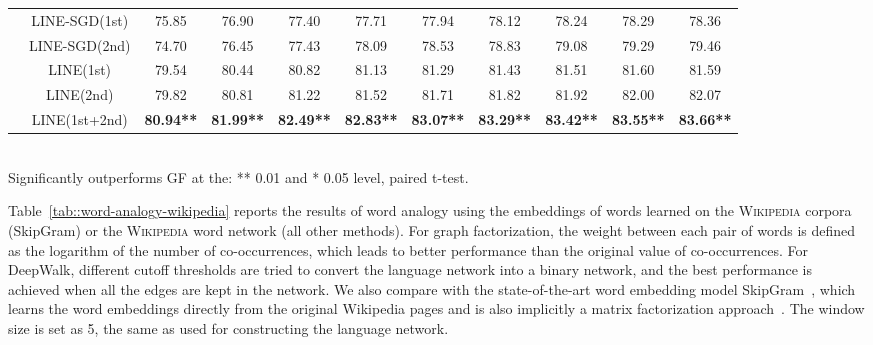 \documentclass{sig-alternate-2013}
\begin{document}
\begin{table*}[!htdb]
{\begin{tabular}{|c|c|c|c|c|c|c|c|c|c|c|}
			&LINE-SGD(1st)& 75.85&	76.90&	77.40&	77.71&	77.94&	78.12&	78.24&	78.29&	78.36 \\
			&LINE-SGD(2nd)& 74.70&	76.45&	77.43&	78.09&	78.53&	78.83&	79.08&	79.29&	79.46\\ 
			&LINE(1st)& 79.54&	80.44&	80.82&	81.13&	81.29&	81.43&	81.51&	81.60&	81.59  \\ 
			&LINE(2nd)& 79.82&	80.81&	81.22&	81.52&	81.71&	81.82&	81.92&	82.00&	82.07 \\ 		
			&LINE(1st+2nd)& \textbf{80.94**}&	\textbf{81.99**}&	\textbf{82.49**}&	\textbf{82.83**}&	\textbf{83.07**}&	\textbf{83.29**}&	\textbf{83.42**}&	\textbf{83.55**}&	\textbf{83.66**} \\ 		\hline
		\end{tabular}
	}
	\\	\scriptsize Significantly outperforms GF at the: ** 0.01 and * 0.05 level, paired t-test.	
\end{table*}


Table~\ref{tab::word-analogy-wikipedia} reports the results of word analogy using the embeddings of words learned on the \textsc{Wikipedia} corpora (SkipGram) or the \textsc{Wikipedia} word network (all other methods). For graph factorization, the weight between each pair of words is defined as the logarithm of the number of co-occurrences, which leads to better performance than the original value of co-occurrences. For DeepWalk, different cutoff thresholds are tried to convert the language network into a binary network, and the best performance is achieved when all the edges are kept in the network. We also compare with the state-of-the-art word embedding model SkipGram~\cite{mikolov2013efficient}, which learns the word embeddings directly from the original Wikipedia pages and is also implicitly a matrix factorization approach~\cite{levy2014neural}. The window size is set as 5, the same as used for constructing the language network. 
\end{document}
